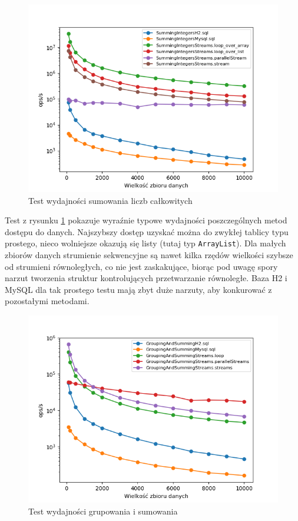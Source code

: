 \documentclass[12pt,twoside,openright]{extarticle}
\begin{document}
\begin{figure}[H]
\centering
\includegraphics[width=15cm]{plots/SummingIntegers}
\caption{Test wydajności sumowania liczb całkowitych}
    \label{fig:summingintegers}
\end{figure}

    Test z rysunku \ref{fig:summingintegers} pokazuje wyraźnie typowe wydajności poszczególnych metod dostępu do danych. Najszybszy dostęp uzyskać można do zwykłej tablicy typu prostego, nieco wolniejsze okazują się listy (tutaj typ \texttt{ArrayList}). Dla małych zbiorów danych strumienie sekwencyjne są nawet kilka rzędów wielkości szybsze od strumieni równoległych, co nie jest zaskakujące, biorąc pod uwagę spory narzut tworzenia struktur kontrolujących przetwarzanie równoległe. Baza H2 i MySQL dla tak prostego testu mają zbyt duże narzuty, aby konkurować z pozostałymi metodami.

\newpage
\begin{figure}[H]
\centering
\includegraphics[width=15cm]{plots/GroupingAndSumming}
\caption{Test wydajności grupowania i sumowania}
    \label{fig:groupingandsumming}
\end{figure}
\end{document}
